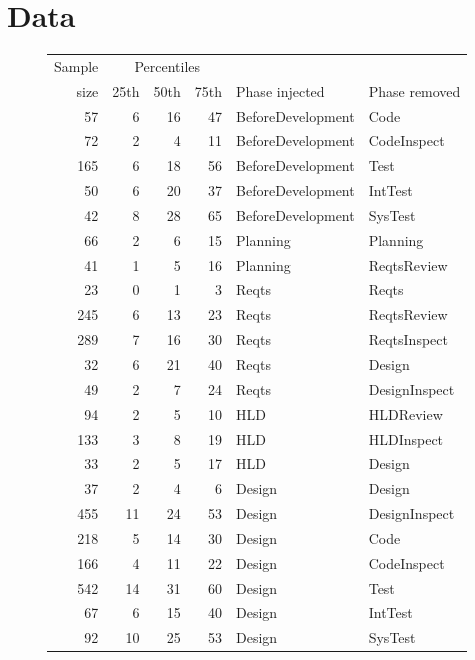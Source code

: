 \documentclass{sig-alternate}
\def\baselinestretch{1}
\begin{document}


\section{Data}

\begin{figure}[!t]

\scriptsize
\begin{center}
\begin{tabular}{r|rrr|ll}
  Sample&\multicolumn{3}{c|}{Percentiles}\\ 
size & 25th & 50th & 75th & Phase injected & Phase removed\\\hline
57& 6& 16& 47&  BeforeDevelopment&Code\\
72& 2& 4& 11&  BeforeDevelopment&CodeInspect\\
165& 6& 18& 56&  BeforeDevelopment&Test\\
50& 6& 20& 37&  BeforeDevelopment&IntTest\\
42& 8& 28& 65&  BeforeDevelopment&SysTest\\\hline

66& 2& 6& 15&  Planning&Planning\\
41& 1& 5& 16&  Planning&ReqtsReview\\\hline

23& 0& 1& 3&  Reqts&Reqts\\
245& 6& 13& 23&  Reqts&ReqtsReview\\
289& 7& 16& 30&  Reqts&ReqtsInspect\\
32& 6& 21& 40&  Reqts&Design\\
49& 2& 7& 24&  Reqts&DesignInspect\\\hline
 

94& 2& 5& 10&  HLD&HLDReview\\
133& 3& 8& 19&  HLD&HLDInspect\\
33& 2& 5& 17&  HLD&Design\\\hline



37& 2& 4& 6&  Design&Design\\
455& 11& 24& 53&  Design&DesignInspect\\
218& 5& 14& 30&  Design&Code\\
166& 4& 11& 22&  Design&CodeInspect\\
542& 14& 31& 60&  Design&Test\\
67& 6& 15& 40&  Design&IntTest\\
92& 10& 25& 53&  Design&SysTest\\\hline


\end{tabular}
\end{center}
\end{figure}
\end{document}
